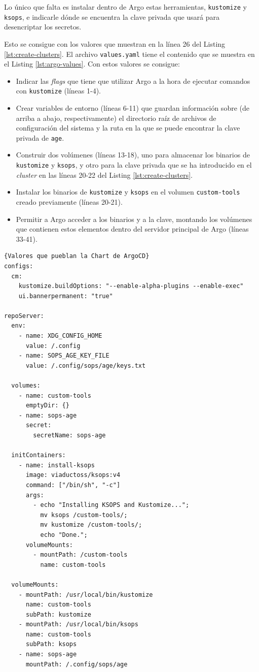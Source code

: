 Lo único que falta es instalar dentro de Argo estas herramientas, \texttt{kustomize} y \texttt{ksops}, e indicarle dónde se encuentra la clave privada que usará para desencriptar los secretos.

Esto se consigue con los valores que muestran en la línea 26 del Listing \ref{lst:create-clusters}. El archivo \texttt{values.yaml} tiene el contenido que se muestra en el Listing \ref{lst:argo-values}. Con estos valores se consigue:

\begin{itemize}
  \item Indicar las \textit{flags} que tiene que utilizar Argo a la hora de ejecutar comandos con \texttt{kustomize} (líneas 1-4).
  \item Crear variables de entorno (líneas 6-11) que guardan información sobre (de arriba a abajo, respectivamente) el directorio raíz de archivos de configuración del sistema y la ruta en la que se puede encontrar la clave privada de \texttt{age}.
  \item Construir dos volúmenes (líneas 13-18), uno para almacenar los binarios de \texttt{kustomize} y \texttt{ksops}, y otro para la clave privada que se ha introducido en el \textit{cluster} en las líneas 20-22 del Listing \ref{lst:create-clusters}.
  \item Instalar los binarios de \texttt{kustomize} y \texttt{ksops} en el volumen \texttt{custom-tools} creado previamente (líneas 20-21).
  \item Permitir a Argo acceder a los binarios y a la clave, montando los volúmenes que contienen estos elementos dentro del servidor principal de Argo (líneas 33-41).
\end{itemize}

\begin{lstlisting}[language=helm,label=lst:argo-values]{Valores que pueblan la Chart de ArgoCD}
configs:
  cm:
    kustomize.buildOptions: "--enable-alpha-plugins --enable-exec"
    ui.bannerpermanent: "true"

repoServer:
  env:
    - name: XDG_CONFIG_HOME
      value: /.config
    - name: SOPS_AGE_KEY_FILE
      value: /.config/sops/age/keys.txt

  volumes:
    - name: custom-tools
      emptyDir: {}
    - name: sops-age
      secret:
        secretName: sops-age

  initContainers:
    - name: install-ksops
      image: viaductoss/ksops:v4
      command: ["/bin/sh", "-c"]
      args:
        - echo "Installing KSOPS and Kustomize...";
          mv ksops /custom-tools/;
          mv kustomize /custom-tools/;
          echo "Done.";
      volumeMounts:
        - mountPath: /custom-tools
          name: custom-tools

  volumeMounts:
    - mountPath: /usr/local/bin/kustomize
      name: custom-tools
      subPath: kustomize
    - mountPath: /usr/local/bin/ksops
      name: custom-tools
      subPath: ksops
    - name: sops-age
      mountPath: /.config/sops/age
\end{lstlisting}

